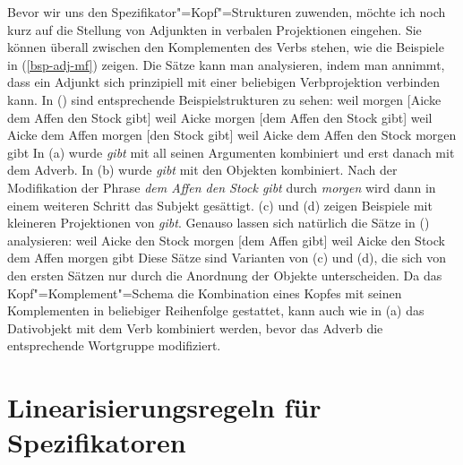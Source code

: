 Bevor wir uns den Spezifikator"=Kopf"=Strukturen zuwenden, möchte ich noch kurz
auf die Stellung von Adjunkten in verbalen Projektionen eingehen. Sie können überall zwischen den
Komplementen des Verbs stehen, wie die Beispiele in (\ref{bsp-adj-mf}) zeigen. Die Sätze kann man analysieren,
indem man annimmt, dass ein Adjunkt sich prinzipiell mit einer beliebigen Verbprojektion
verbinden kann. In () sind entsprechende Beispielstrukturen zu sehen:
\eal
\label{bsp-adj-mf-zwei}
\ex weil morgen [Aicke dem Affen den Stock gibt]
\ex weil Aicke morgen [dem Affen den Stock gibt]
\ex weil Aicke dem Affen morgen [den Stock gibt]
\ex weil Aicke dem Affen den Stock morgen gibt
\zl
In (a) wurde \emph{gibt} mit all seinen Argumenten kombiniert und erst danach
mit dem Adverb. In (b) wurde \emph{gibt} mit den Objekten kombiniert. Nach der
Modifikation der Phrase \emph{dem Affen den Stock gibt} durch \emph{morgen} wird dann
in einem weiteren Schritt das Subjekt gesättigt. (c) und (d) zeigen Beispiele mit kleineren
Projektionen von \emph{gibt}. Genauso lassen sich natürlich die Sätze in ()
analysieren:
\eal
\ex weil Aicke den Stock morgen [dem Affen gibt]
\ex weil Aicke den Stock dem Affen morgen gibt
\zl
Diese Sätze sind Varianten von (c) und (d), die sich von den ersten Sätzen
nur durch die Anordnung der Objekte unterscheiden. Da das Kopf"=Komplement"=Schema die Kombination
eines Kopfes mit seinen Komplementen in beliebiger Reihenfolge gestattet, kann auch wie in (a)
das Dativobjekt mit dem Verb kombiniert werden, bevor das Adverb die entsprechende Wortgruppe
modifiziert.%


\section{Linearisierungsregeln für Spezifikatoren}
\label{sec-spr}

